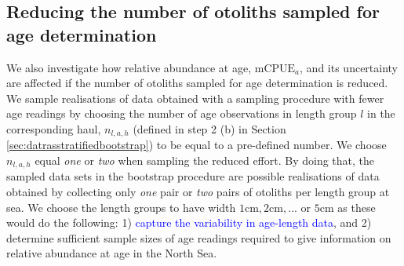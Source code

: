 \documentclass[a4paper 12pt]{article}
\numberwithin{equation}{section}
\newcommand{\nat}[1]{\textcolor{blue}{#1}}
\begin{document}
\subsection{Reducing the number of otoliths sampled for age determination}
\label{sec:reducingeffort}
We also investigate how relative abundance at age, $\text{mCPUE}_a$, and its uncertainty are affected if the  number of otoliths sampled for age determination is reduced. We sample realisations of data obtained with a sampling procedure with fewer age readings by choosing the number of age observations in length group $l$ in the corresponding haul,  $n_{l,a,h}$ (defined in step 2 (b) in Section \ref{sec:datrasstratifiedbootstrap}) to be equal to a pre-defined number. We choose $n_{l,a,h}$ equal \textit{one} or \textit{two} when sampling the reduced effort. By doing that, the sampled data sets in the bootstrap procedure are possible realisations of data obtained by collecting only \textit{one} pair or \textit{two} pairs of otoliths per length group at sea. We choose the length groups to have width $1 \text{cm},2\text{cm},...\text{ or }5\text{cm}$ as these would do the following: 1) \nat{capture the variability in age-length data}, and 2) determine sufficient sample sizes of age readings required to give information on relative abundance at age in the North Sea.
\end{document}
